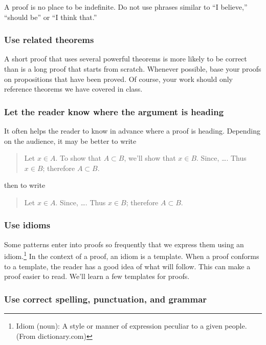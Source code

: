 \documentclass[12pt,fleqn]{article}
\newcounter{ex}\setcounter{ex}{0}
\newcounter{id}\setcounter{id}{0}
\newcounter{se}\setcounter{se}{0}
\begin{document}
A proof is no place to be indefinite.  Do not use  phrases similar 
to ``I believe,'' ``should be'' or ``I think that.''





 \subsubsection{  Use related theorems}  

A short proof that uses several powerful theorems is more likely to be
correct than is a long proof that starts from scratch.  Whenever
possible, base your proofs on propositions that have been proved.  Of
course, your work should only reference theorems we have covered in class.

 \subsubsection{  Let the reader know where the argument is heading} 

It often helps the reader to know in advance where a proof is heading.
Depending on the audience, it may be better to write

\begin{quote}
  Let $x \in A$.  To show that $ A \subset B$, we'll show that
  $x \in B$. Since, \dots. Thus $x \in B$; therefore $A \subset B$.
\end{quote}
then to write
\begin{quote}
  Let $x \in A$.  Since, \dots. Thus $x \in B$; therefore $A \subset B$.
\end{quote}

 \subsubsection{  Use idioms}

Some patterns enter into proofs so frequently that we express them
using an idiom.\footnote{Idiom (noun): A style or manner of expression
peculiar to a given people. (From dictionary.com)} In the context of 
a proof, an idiom is a template.  When a proof conforms to a template, the
reader has a good idea of what will follow.  This can make a proof easier to
read. We'll learn a few templates for proofs. 



 \subsubsection{  Use correct spelling, punctuation, and grammar}
\end{document}
